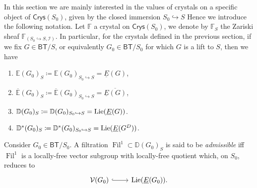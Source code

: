 \begin{ntt}[]\label{CrystalAssociatedZarSheafS}
	In this section we are mainly interested in the values of
	crystals on a specific object of $\mathsf{Crys}(S_0)$, given
	by the closed immersion $S_0 \hookrightarrow S$
	Hence we introduce the following notation.
	Let $\mathbb{F}$ a crystal on $\mathsf{Crys}(S_0)$,
	we denote by $\mathbb{F}_S$ the Zariski sheaf
	$\mathbb{F}_{\left(S_0 \hookrightarrow S, \mathcal{I}\right)}$.
	In particular, for the crystals defined in the previous section, 
	if we fix \(G \in \mathsf{BT}/S\), or equivalently \(G_0 \in \mathsf{BT}/S_0\)
	for which \(G\) is a lift to \(S\), then we have
\begin{enumerate}
	\item $\mathbb{E}(G_0)_S \coloneqq \mathbb{E}(G_0)_{S_0 \hookrightarrow S} = \underline{E}(G)$,
	\item $\overline{\mathbb{E}}(G_0)_S \coloneqq \overline{\mathbb{E}}(G_0)_{S_0 \hookrightarrow S} = 
		\overline{\underline{E}(G)}$,
	\item $\mathbb{D}(G_0)_S \coloneqq \mathbb{D}(G_0)_{S_0 \hookrightarrow S} = 
		\operatorname{Lie}(\underline{E}(G))$.
	\item $\mathbb{D}^*(G_0)_S \coloneqq \mathbb{D}^*(G_0)_{S_0 \hookrightarrow S} = 
		\operatorname{Lie}(\underline{E}(G^D))$.
\end{enumerate}
\end{ntt}


\begin{defn}
	Consider $G_0 \in \mathsf{BT}/S_0$.
	A filtration $\operatorname{Fil}^1 \subset \mathbb{D}(G_0)_S$ is said to be
	\emph{admissible} iff $\operatorname{Fil}^1$ is a locally-free vector subgroup
	with locally-free quotient which, on $S_0$, reduces to
	\begin{equation*}
	\begin{tikzcd}[row sep = 0ex
		,/tikz/column 1/.append style={anchor=base east}
		,/tikz/column 2/.append style={anchor=base west}]
		\mathcal{V}(G_0) \arrow[r, "", hookrightarrow] &
		\lie(\underline{E}(G_0))
	.\end{tikzcd}
	\end{equation*} 
\end{defn}


